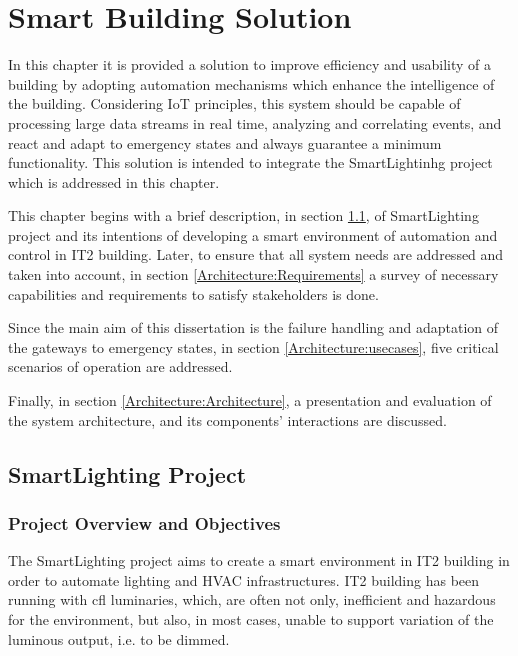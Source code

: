 \chapter{Smart Building Solution}
\label{chapter:architecture}

In this chapter it is provided a solution to improve efficiency and usability of a building by adopting automation mechanisms which enhance the intelligence of the building. Considering IoT principles, this system should be capable of processing large data streams in real time, analyzing and correlating events, and react and adapt to emergency states and always guarantee a minimum functionality. This solution is intended to integrate the SmartLightinhg project which is addressed in this chapter.


This chapter begins with a brief description, in section \ref{Architecture:slproject}, of SmartLighting project and its intentions of developing a smart environment of automation and control in IT2 building. Later, to ensure that all system needs are addressed and taken into account, in section \ref{Architecture:Requirements} a survey of necessary capabilities and requirements to satisfy stakeholders is done.

Since the main aim of this dissertation is the failure handling and adaptation of the gateways to emergency states, in section \ref{Architecture:usecases}, five critical scenarios of operation are addressed.

Finally, in section \ref{Architecture:Architecture}, a presentation and evaluation of the system architecture, and its components’ interactions are discussed.

\newpage


\section{SmartLighting Project}
\label{Architecture:slproject}

\subsection{Project Overview and Objectives}
\label{Architecture:Overview}

The SmartLighting project\cite{Moreira} aims to create a smart environment in IT2 building in order to automate lighting and HVAC infrastructures. IT2 building has been running with \acf{cfl} luminaries, which, are often not only, inefficient and hazardous for the environment, but also, in most cases, unable to support variation of the luminous output, i.e. to be dimmed.

